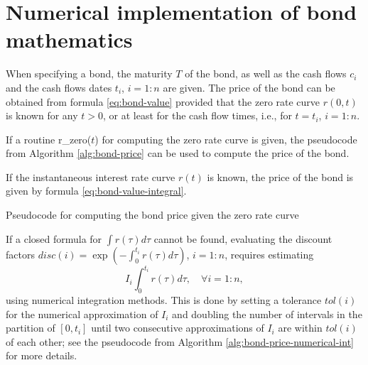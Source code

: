 \section{Numerical implementation of bond mathematics}
When specifying a bond, the maturity $ T $ of the bond, as well as the cash
    flows $ c_i $ and the cash flows dates $ t_i $, $ i = 1 : n $ are given.
The price of the bond can be obtained from formula \eqref{eq:bond-value}
    provided that the zero rate curve $ r(0, t) $ is known for any $ t > 0 $,
    or at least for the cash flow times, i.e., for $ t = t_i $, $ i = 1 : n $.

If a routine r\_zero($ t $) for computing the zero rate curve is given, the
    pseudocode from Algorithm \ref{alg:bond-price} can be used to compute the
    price of the bond.

If the instantaneous interest rate curve $ r(t) $ is known, the price of the
    bond is given by formula \eqref{eq:bond-value-integral}.
\begin{algorithm}
    \caption{Pseudocode for computing the bond price given the zero rate curve}
    \label{alg:bond-price}
    \begin{algorithmic}

        \State{}


        \State{}

        \EndFor
    \end{algorithmic}
\end{algorithm}
If a closed formula for $ \int r(\tau) d\tau $ cannot be found, evaluating the
    discount factors $ disc(i) = \exp \left( -\int_{0}^{t_i} r(\tau) d\tau
    \right) $, $ i = 1 : n $, requires estimating
\begin{equation*}
    I_i \int_{0}^{t_i} r(\tau) d\tau, \quad \forall i = 1 : n,
\end{equation*}
using numerical integration methods.
This is done by setting a tolerance $ tol(i) $ for the numerical approximation
    of $ I_i $ and doubling the number of intervals in the partition of
    $ [0, t_i] $ until two consecutive approximations of $ I_i $ are within
    $ tol(i) $ of each other; see the pseudocode from Algorithm
    \ref{alg:bond-price-numerical-int} for more details.


